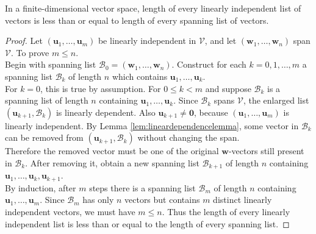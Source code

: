 \begin{theorem} \label{thm:finitedimlenofvec} In a finite-dimensional vector space, length of every linearly independent list of vectors is less than or equal to length of every spanning list of vectors.
\begin{proof} Let $(\mathbf{u}_1, \ldots, \mathbf{u}_m)$ be linearly independent in $\mathcal{V}$, and let $(\mathbf{w}_1, \ldots, \mathbf{w}_n)$ span $\mathcal{V}$. To prove $m \leq n$.\\
Begin with spanning list $\mathcal{B}_0 = (\mathbf{w}_1, \ldots, \mathbf{w}_n)$. Construct for each $k = 0, 1, \ldots, m$ a spanning list $\mathcal{B}_k$ of length $n$ which contains $\mathbf{u}_1, \ldots, \mathbf{u}_k$.\\
For $k = 0$, this is true by assumption. For $0 \leq k < m$ and suppose $\mathcal{B}_k$ is a spanning list of length $n$ containing $\mathbf{u}_1, \ldots, \mathbf{u}_k$. Since $\mathcal{B}_k$ spans $\mathcal{V}$, the enlarged list $(\mathbf{u}_{k+1}, \mathcal{B}_k)$ is linearly dependent. Also $\mathbf{u}_{k+1} \neq \mathbf{0}$, because $(\mathbf{u}_1, \ldots, \mathbf{u}_m)$ is linearly independent. By Lemma \ref{lem:lineardependencelemma}, some vector in $\mathcal{B}_k$ can be removed from $(\mathbf{u}_{k+1}, \mathcal{B}_k)$ without changing the span.\\
Therefore the removed vector must be one of the original $\mathbf{w}$-vectors still present in $\mathcal{B}_k$. After removing it, obtain a new spanning list $\mathcal{B}_{k+1}$ of length $n$ containing $\mathbf{u}_1, \ldots, \mathbf{u}_k, \mathbf{u}_{k+1}$.\\
By induction, after $m$ steps there is a spanning list $\mathcal{B}_m$ of length $n$ containing $\mathbf{u}_1, \ldots, \mathbf{u}_m$. Since $\mathcal{B}_m$ has only $n$ vectors but contains $m$ distinct linearly independent vectors, we must have $m \leq n$. Thus the length of every linearly independent list is less than or equal to the length of every spanning list.
\end{proof}
\end{theorem}

